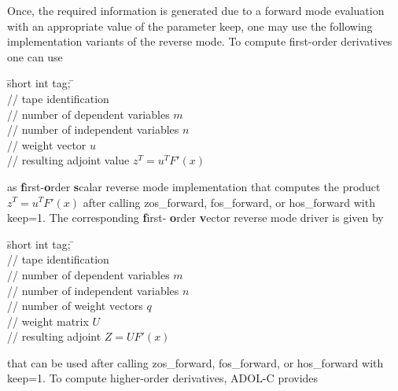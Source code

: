 \documentclass[11pt,twoside]{article}
\begin{document}
Once, the required information is generated due to a forward mode evaluation
with an appropriate value of the parameter {\sf keep}, one may use the
following implementation variants of the reverse mode. To compute first-order derivatives
one can use
\begin{tabbing}
\hspace{0.5in}\={\sf short int tag;} \hspace{1.1in}\= \kill    %
\\
         \> // tape identification \\
                 \> // number of  dependent variables $m$\\
                 \> // number of independent variables $n$\\
           \> // weight vector $u$\\
           \> // resulting adjoint value $z^T=u^T F'(x)$
\end{tabbing}                 
as {\bf f}irst-{\bf o}rder {\bf s}calar reverse mode implementation that computes
the product $z^T=u^T F'(x)$ after calling  {\sf zos\_forward}, {\sf fos\_forward}, or 
{\sf hos\_forward} with {\sf keep}=1. The corresponding {\bf f}irst-{\bf
  o}rder {\bf v}ector reverse mode driver is given by
\begin{tabbing}
\hspace{0.5in}\={\sf short int tag;} \hspace{1.1in}\= \kill    %
\\
         \> // tape identification \\
                 \> // number of  dependent variables $m$\\
                 \> // number of independent variables $n$\\
                 \> // number of weight vectors $q$\\
        \> // weight matrix $U$\\
        \> // resulting adjoint $Z=U F'(x)$
\end{tabbing}                 
that can be used after calling  {\sf zos\_forward}, {\sf fos\_forward}, or 
{\sf hos\_forward} with {\sf keep}=1. To compute higher-order derivatives,
ADOL-C provides
\end{document}
